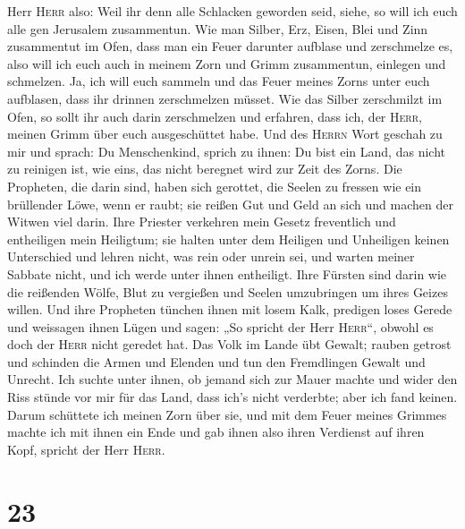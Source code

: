 Herr \textsc{Herr} also: Weil ihr denn alle Schlacken geworden seid,
siehe, so will ich euch alle gen Jerusalem zusammentun. 
Wie man Silber, Erz, Eisen, Blei und Zinn zusammentut im Ofen, dass man
ein Feuer darunter aufblase und zerschmelze es, also will ich euch auch
in meinem Zorn und Grimm zusammentun, einlegen und schmelzen.
 Ja, ich will euch sammeln und das Feuer meines Zorns
unter euch aufblasen, dass ihr drinnen zerschmelzen müsset.
 Wie das Silber zerschmilzt im Ofen, so sollt ihr auch
darin zerschmelzen und erfahren, dass ich, der \textsc{Herr}, meinen
Grimm über euch ausgeschüttet habe.  Und des
\textsc{Herrn} Wort geschah zu mir und sprach:  Du
Menschenkind, sprich zu ihnen: Du bist ein Land, das nicht zu reinigen
ist, wie eins, das nicht beregnet wird zur Zeit des Zorns.
 Die Propheten, die darin sind, haben sich gerottet, die
Seelen zu fressen wie ein brüllender Löwe, wenn er raubt; sie reißen Gut
und Geld an sich und machen der Witwen viel darin.  Ihre
Priester verkehren mein Gesetz freventlich und entheiligen mein
Heiligtum; sie halten unter dem Heiligen und Unheiligen keinen
Unterschied und lehren nicht, was rein oder unrein sei, und warten
meiner Sabbate nicht, und ich werde unter ihnen entheiligt.
 Ihre Fürsten sind darin wie die reißenden Wölfe, Blut zu
vergießen und Seelen umzubringen um ihres Geizes willen. 
Und ihre Propheten tünchen ihnen mit losem Kalk, predigen loses Gerede
und weissagen ihnen Lügen und sagen: „So spricht der Herr
\textsc{Herr}``, obwohl es doch der \textsc{Herr} nicht geredet hat.
 Das Volk im Lande übt Gewalt; rauben getrost und
schinden die Armen und Elenden und tun den Fremdlingen Gewalt und
Unrecht.  Ich suchte unter ihnen, ob jemand sich zur
Mauer machte und wider den Riss stünde vor mir für das Land, dass ich's
nicht verderbte; aber ich fand keinen.  Darum schüttete
ich meinen Zorn über sie, und mit dem Feuer meines Grimmes machte ich
mit ihnen ein Ende und gab ihnen also ihren Verdienst auf ihren Kopf,
spricht der Herr \textsc{Herr}.

\hypertarget{section-22}{%
\section{23}\label{section-22}}

